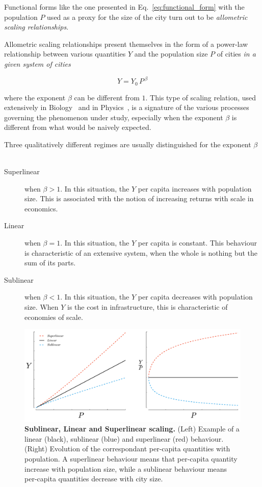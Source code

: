 Functional forms like the one presented in Eq.~\ref{eq:functional_form} with the
population $P$ used as a proxy for the size of the city turn out to be 
\emph{allometric scaling relationships}.

Allometric scaling relationships present themselves in the form of a power-law
relationship between various quantities $Y$ and the population size $P$ of
cities \emph{in a given system of cities} 

\begin{equation}
    Y = Y_0\,P^{\,\beta}
    \label{eq:scaling_definition}
\end{equation}

where the exponent $\beta$ can be different from $1$. This type of scaling
relation, used extensively in Biology~\cite{Thompson:1942} and in
Physics~\cite{Barenblatt:1996}, is a signature of the various processes
governing the phenomenon under study, especially when the exponent $\beta$ is
different from what would be naively expected. 

Three qualitatively different regimes are usually distinguished for the exponent
$\beta$~\cite{Bettencourt:2007}

\begin{description}
    \item[Superlinear] when $\beta>1$. In this situation, the $Y$ per capita
        increases with population size. This is associated with the notion of
        increasing returns with scale in economics.
    \item[Linear] when $\beta=1$. In this situation, the $Y$ per capita is
        constant. This behaviour is characteristic of an extensive system, when
        the whole is nothing but the sum of its parts.
    \item[Sublinear] when $\beta<1$. In this situation, the $Y$ per capita
        decreases with population size. When $Y$ is the cost in infrastructure,
        this is characteristic of economies of scale.
\end{description}    

\begin{figure}[!h]
    \centering
    \includegraphics[width=\textwidth]{gfx/chapter-scaling/scaling_scheme.pdf}
    \caption{{\bf Sublinear, Linear and Superlinear scaling.} (Left) Example of a linear (black), sublinear (blue) and superlinear (red)
    behaviour. (Right) Evolution of the correspondant per-capita quantities with
population. A superlinear behaviour means that per-capita quantity increase with
population size, while a sublinear behaviour means per-capita quantities
decrease with city size.\label{fig:scaling_scheme}}
\end{figure}


